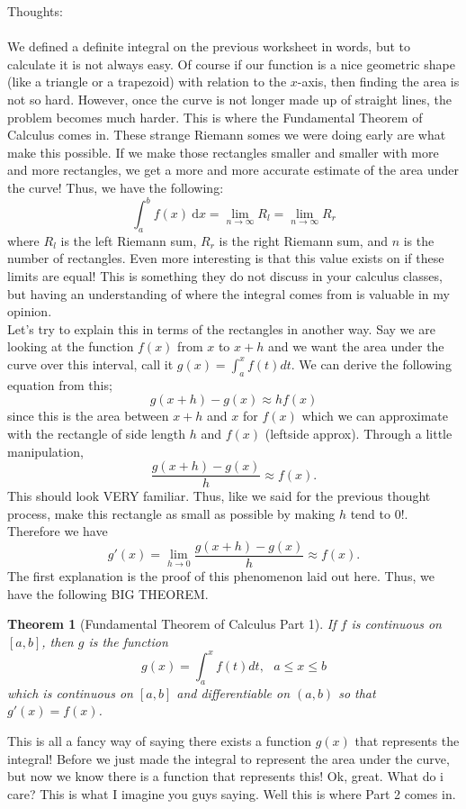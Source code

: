 \documentclass[10pt]{article}
\newcommand{\ds}{\displaystyle}
\newcommand{\dx}{\:\mathrm{d}x}
\theoremstyle{Theorem}
\newtheorem{theorem}{Theorem}[section]
\theoremstyle{definition}
\theoremstyle{remark}
\theoremstyle{custom}
\begin{document}
\thispagestyle{firststyle}
\pagestyle{plain}

Thoughts:\\\\
We defined a definite integral on the previous worksheet in words, but to calculate it is not always easy. Of course if our function is a nice geometric shape (like a triangle or a trapezoid) with relation to the $x$-axis, then finding the area is not so hard. However, once the curve is not longer made up of straight lines, the problem becomes much harder. This is where the Fundamental Theorem of Calculus comes in. These strange Riemann somes we were doing early are what make this possible. If we make those rectangles smaller and smaller with more and more rectangles, we get a more and more accurate estimate of the area under the curve! Thus, we have the following: 
\[
\int_a^bf(x)\dx=\lim_{n\rightarrow \infty} R_l=\lim_{n\rightarrow \infty} R_r
\]
where $R_l$ is the left Riemann sum, $R_r$ is the right Riemann sum, and $n$ is the number of rectangles.  Even more interesting is that this value exists on if these limits are equal! This is something they do not discuss in your calculus classes, but having an understanding of where the integral comes from is valuable in my opinion. \\
Let's try to explain this in terms of the rectangles in another way. Say we are looking at the function $f(x)$ from $x$ to $x+h$ and we want the area under the curve over this interval, call it $g(x)=\ds \int_a^x f(t)dt$.  We can derive the following equation from this;
\[
g(x+h)-g(x)\approx hf(x)
\]
since this is the area between $x+h$ and $x$ for $f(x)$ which we can approximate with the rectangle of side length $h$ and $f(x)$ (leftside approx). Through a little manipulation, 
\[
\dfrac{g(x+h)-g(x)}{h}\approx f(x).
\]
This should look VERY familiar. Thus, like we said for the previous thought process, make this rectangle as small as possible by making $h$ tend to 0!. Therefore we have
\[
g'(x)=\lim_{h\rightarrow0}\dfrac{g(x+h)-g(x)}{h}\approx f(x).
\]
The first explanation is the proof of this phenomenon laid out here. Thus, we have the following BIG THEOREM.
\begin{theorem}[Fundamental Theorem of Calculus Part 1]
If $f$ is continuous on $[a,b]$, then $g$ is the function 
\[
g(x)=\int_a^xf(t)dt, \text{  } a\leq x\leq b
\]
which is continuous on $[a,b]$ and differentiable on $(a,b)$ so that $g'(x)=f(x)$.
\end{theorem}
This is all a fancy way of saying there exists a function $g(x)$ that represents the integral! Before we just made the integral to represent the area under the curve, but now we know there is a function that represents this! Ok, great. What do i care? This is what I imagine you guys saying. Well this is where Part 2 comes in. 
\end{document}
